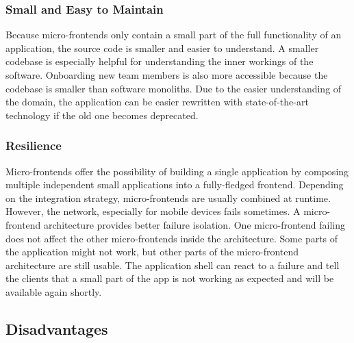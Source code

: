 \subsubsection{Small and Easy to Maintain}\label{subsubsection:background:micro-frontend-small-and-easy-to-maintain}

Because micro-frontends only contain a small part of the full functionality of an application, the source code is smaller and easier to understand. A smaller codebase is especially helpful for understanding the inner workings of the software. Onboarding new team members is also more accessible because the codebase is smaller than software monoliths. Due to the easier understanding of the domain, the application can be easier rewritten with state-of-the-art technology if the old one becomes deprecated. \cite{book:2020:geers:background:micro-frontends:micro-frontends-in-action}

\subsubsection{Resilience}\label{subsubsection:background:micro-frontend-resilience}

Micro-frontends offer the possibility of building a single application by composing multiple independent small applications into a fully-fledged frontend. Depending on the integration strategy, micro-frontends are usually combined at runtime. However, the network, especially for mobile devices fails sometimes. A micro-frontend architecture provides better failure isolation. One micro-frontend failing does not affect the other micro-frontends inside the architecture. Some parts of the application might not work, but other parts of the micro-frontend architecture are still usable. The application shell can react to a failure and tell the clients that a small part of the app is not working as expected and will be available again shortly. \cite[10-11]{article:2021:perltonen:background:micro-frontends:motivations-benefits-and-issues}

\subsection{Disadvantages}\label{subsection:background:micro-frontend-downsides}

